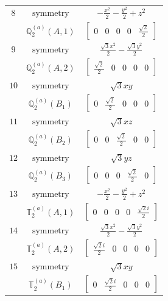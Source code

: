 \documentclass[fleqn,8pt,landscape]{jsarticle}
\begin{document}
\begin{longtable}{ccc}
$ 8 $ & $ \text{symmetry} $ & $ - \frac{x^{2}}{2} - \frac{y^{2}}{2} + z^{2} $ \\
$  $ & $ \mathbb{Q}_{2}^{(a)}(A,1) $ & $ \begin{bmatrix} 0 & 0 & 0 & 0 & \frac{\sqrt{2}}{2} \end{bmatrix} $ \\ \hline
$ 9 $ & $ \text{symmetry} $ & $ \frac{\sqrt{3} x^{2}}{2} - \frac{\sqrt{3} y^{2}}{2} $ \\
$  $ & $ \mathbb{Q}_{2}^{(a)}(A,2) $ & $ \begin{bmatrix} \frac{\sqrt{2}}{2} & 0 & 0 & 0 & 0 \end{bmatrix} $ \\ \hline
$ 10 $ & $ \text{symmetry} $ & $ \sqrt{3} x y $ \\
$  $ & $ \mathbb{Q}_{2}^{(a)}(B_{1}) $ & $ \begin{bmatrix} 0 & \frac{\sqrt{2}}{2} & 0 & 0 & 0 \end{bmatrix} $ \\ \hline
$ 11 $ & $ \text{symmetry} $ & $ \sqrt{3} x z $ \\
$  $ & $ \mathbb{Q}_{2}^{(a)}(B_{2}) $ & $ \begin{bmatrix} 0 & 0 & \frac{\sqrt{2}}{2} & 0 & 0 \end{bmatrix} $ \\ \hline
$ 12 $ & $ \text{symmetry} $ & $ \sqrt{3} y z $ \\
$  $ & $ \mathbb{Q}_{2}^{(a)}(B_{3}) $ & $ \begin{bmatrix} 0 & 0 & 0 & \frac{\sqrt{2}}{2} & 0 \end{bmatrix} $ \\ \hline
$ 13 $ & $ \text{symmetry} $ & $ - \frac{x^{2}}{2} - \frac{y^{2}}{2} + z^{2} $ \\
$  $ & $ \mathbb{T}_{2}^{(a)}(A,1) $ & $ \begin{bmatrix} 0 & 0 & 0 & 0 & \frac{\sqrt{2} i}{2} \end{bmatrix} $ \\ \hline
$ 14 $ & $ \text{symmetry} $ & $ \frac{\sqrt{3} x^{2}}{2} - \frac{\sqrt{3} y^{2}}{2} $ \\
$  $ & $ \mathbb{T}_{2}^{(a)}(A,2) $ & $ \begin{bmatrix} \frac{\sqrt{2} i}{2} & 0 & 0 & 0 & 0 \end{bmatrix} $ \\ \hline
$ 15 $ & $ \text{symmetry} $ & $ \sqrt{3} x y $ \\
$  $ & $ \mathbb{T}_{2}^{(a)}(B_{1}) $ & $ \begin{bmatrix} 0 & \frac{\sqrt{2} i}{2} & 0 & 0 & 0 \end{bmatrix} $ \\ \hline

\end{longtable}
\end{document}
